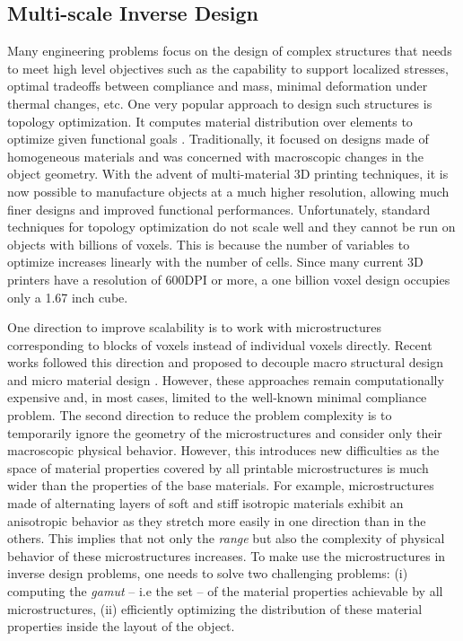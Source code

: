 \subsection{Multi-scale Inverse Design}
Many engineering problems focus on the design of complex structures that needs to meet high level objectives such as the capability to support localized stresses, optimal tradeoffs between compliance and mass, minimal deformation under thermal changes, etc. One very popular approach to design such structures is topology optimization. It computes material distribution over elements to optimize given functional goals \cite{bendsoe2004topology}.
Traditionally, it focused on designs made of homogeneous materials and was concerned with macroscopic changes in the object geometry.
With the advent of multi-material 3D printing techniques, it is now possible to manufacture objects at a much higher resolution, allowing much finer designs and improved functional performances.
Unfortunately, standard techniques for topology optimization do not scale well and they cannot be run on objects with billions of voxels. This is because the number of variables to optimize increases linearly with the number of cells. Since many current 3D printers have a resolution of 600DPI or more, a one billion voxel design occupies only a 1.67 inch cube.

One direction to improve scalability is to work with microstructures corresponding to blocks of voxels instead of individual voxels directly. Recent works followed this direction and proposed to decouple macro structural design and micro material design \cite{rodrigues:2002:hierarchical,coelho:2008:hierarchical,nakshatrala:2013:nonlinear}. However, these approaches remain computationally expensive and, in most cases, limited to the well-known minimal compliance problem.
The second direction to reduce the problem complexity is to temporarily ignore the geometry of the microstructures and consider only their macroscopic physical behavior.
However, this introduces new difficulties as the space of material properties covered by all printable microstructures is much wider than the properties of the base materials.
For example, microstructures made of alternating layers of soft and stiff isotropic materials exhibit an anisotropic behavior as they stretch more easily in one direction than in the others.
This implies that not only the {\it range} but also the complexity of physical behavior of these microstructures increases.
To make use the microstructures in inverse design problems, one needs to solve two challenging problems:
(i) computing the {\it gamut} -- i.e the set -- of the material properties achievable by all microstructures, (ii) efficiently optimizing the distribution of these material properties inside the layout of the object.
